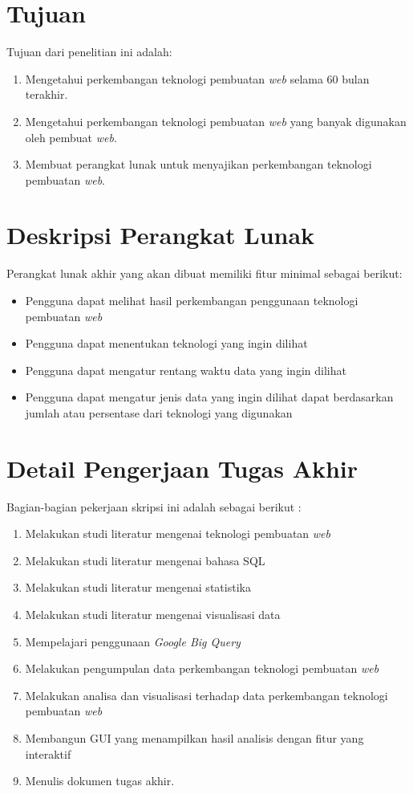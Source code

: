 \documentclass[a4paper,twoside]{article}
\newcommand{\web}{\textit{web}\xspace}
\begin{document}
	\section{Tujuan}
	Tujuan dari penelitian ini adalah:
    \begin{enumerate}
        \item Mengetahui perkembangan teknologi pembuatan \web selama 60 bulan terakhir.
        \item Mengetahui perkembangan teknologi pembuatan \web yang banyak digunakan oleh pembuat \web.
        \item Membuat perangkat lunak untuk menyajikan perkembangan teknologi pembuatan \web.
    \end{enumerate}
	
	\section{Deskripsi Perangkat Lunak}
	Perangkat lunak akhir yang akan dibuat memiliki fitur minimal sebagai berikut:
	\begin{itemize}
		\item Pengguna dapat melihat hasil perkembangan penggunaan teknologi pembuatan \web
		\item Pengguna dapat menentukan teknologi yang ingin dilihat  
		\item Pengguna dapat mengatur rentang waktu data yang ingin dilihat
		\item Pengguna dapat mengatur jenis data yang ingin dilihat dapat berdasarkan jumlah atau persentase dari teknologi yang digunakan
	\end{itemize}
	
	\section{Detail Pengerjaan Tugas Akhir}
	Bagian-bagian pekerjaan skripsi ini adalah sebagai berikut :
	\begin{enumerate}
		\item Melakukan studi literatur mengenai teknologi pembuatan \web
		\item Melakukan studi literatur mengenai bahasa SQL
            \item Melakukan studi literatur mengenai statistika
		\item Melakukan studi literatur mengenai visualisasi data
		\item Mempelajari penggunaan \textit{Google Big Query}
		\item Melakukan pengumpulan data perkembangan teknologi pembuatan \web
		\item Melakukan analisa dan visualisasi terhadap data perkembangan teknologi pembuatan \web
		\item Membangun GUI yang menampilkan hasil analisis dengan fitur yang interaktif 
		\item Menulis dokumen tugas akhir.
	\end{enumerate}
	
\end{document}
